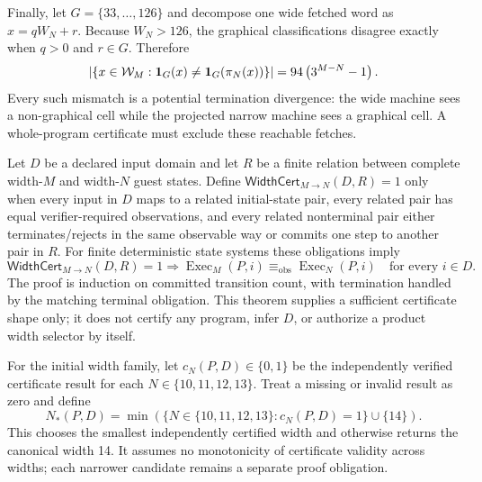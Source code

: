 \documentclass{article}
\begin{document}
Finally, let $G=\{33,\ldots,126\}$ and decompose one wide fetched word as
$x=qW_N+r$. Because $W_N>126$, the graphical classifications disagree exactly
when $q>0$ and $r\in G$. Therefore
\begin{equation}
  \left|\left\{x\in\mathcal{W}_{M}:
    \mathbf{1}_G(x)\neq\mathbf{1}_G(\pi_N(x))\right\}\right|
    =94\left(3^{M-N}-1\right).
  \label{eq:optimization-profile-width-graphical-fetch-mismatch-count}
\end{equation}
Every such mismatch is a potential termination divergence: the wide machine
sees a non-graphical cell while the projected narrow machine sees a graphical
cell. A whole-program certificate must exclude these reachable fetches.

Let $D$ be a declared input domain and let $R$ be a finite relation between
complete width-$M$ and width-$N$ guest states. Define
$\mathsf{WidthCert}_{M\to N}(D,R)=1$ only when every input in $D$ maps to a
related initial-state pair, every related pair has equal verifier-required
observations, and every related nonterminal pair either terminates/rejects in
the same observable way or commits one step to another pair in $R$. For
finite deterministic state systems these obligations imply
\begin{equation}
  \mathsf{WidthCert}_{M\to N}(D,R)=1
  \Longrightarrow
  \operatorname{Exec}_M(P,i)\equiv_{\mathrm{obs}}
  \operatorname{Exec}_N(P,i)
  \quad\text{for every }i\in D.
  \label{eq:optimization-profile-width-finite-bisimulation-certificate}
\end{equation}
The proof is induction on committed transition count, with termination handled
by the matching terminal obligation. This theorem supplies a sufficient
certificate shape only; it does not certify any program, infer $D$, or authorize
a product width selector by itself.

For the initial width family, let $c_N(P,D)\in\{0,1\}$ be the independently
verified certificate result for each $N\in\{10,11,12,13\}$. Treat a missing or
invalid result as zero and define
\begin{equation}
  N_*(P,D)
    = \min\left(
        \{N\in\{10,11,12,13\}:c_N(P,D)=1\}\cup\{14\}
      \right).
  \label{eq:optimization-profile-width-minimum-certified-selector}
\end{equation}
This chooses the smallest independently certified width and otherwise returns
the canonical width 14. It assumes no monotonicity of certificate validity
across widths; each narrower candidate remains a separate proof obligation.
\end{document}
